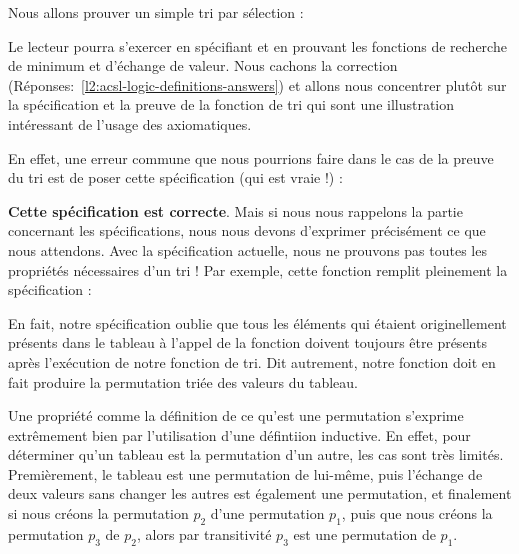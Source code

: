 \label{l3:acsl-logic-definitions-inductive-sort}




Nous allons prouver un simple tri par sélection :





Le lecteur pourra s'exercer en spécifiant et en prouvant les fonctions de
recherche de minimum et d'échange de valeur. Nous cachons la correction
(Réponses:~\ref{l2:acsl-logic-definitions-answers}) et allons nous concentrer
plutôt sur la spécification et la preuve de la fonction de tri qui sont une
illustration intéressant de l'usage des axiomatiques.


En effet, une erreur commune que nous pourrions faire dans le cas de la preuve
du tri est de poser cette spécification (qui est vraie !) :






\textbf{Cette spécification est correcte}. Mais si nous nous rappelons la
partie concernant les spécifications, nous nous devons d'exprimer précisément ce
que nous attendons. Avec la spécification actuelle, nous ne prouvons pas toutes
les propriétés nécessaires d'un tri ! Par exemple, cette fonction remplit
pleinement la spécification :






En fait, notre spécification oublie que tous les éléments qui étaient
originellement présents dans le tableau à l'appel de la fonction doivent
toujours être présents après l'exécution de notre fonction de tri. Dit
autrement, notre fonction doit en fait produire la permutation triée des
valeurs du tableau.



Une propriété comme la définition de ce qu'est une permutation s'exprime
extrêmement bien par l'utilisation d'une défintiion inductive. En effet, pour
déterminer qu'un tableau est la permutation d'un autre, les cas sont très limités.
Premièrement, le tableau est une permutation de lui-même, puis l'échange de
deux valeurs sans changer les autres est également une permutation, et
finalement si nous créons la permutation $p_2$ d'une permutation $p_1$, puis que
nous créons la permutation $p_3$ de $p_2$, alors par transitivité $p_3$ est une
permutation de $p_1$.



